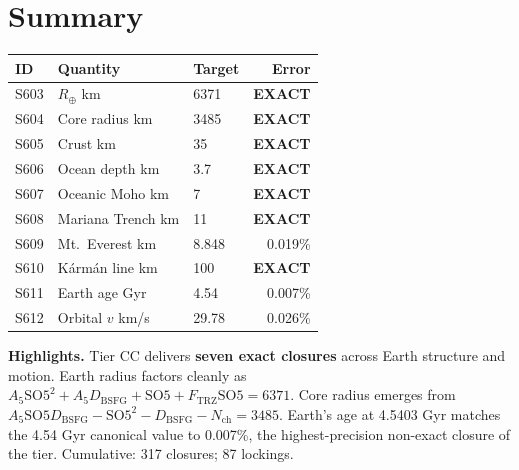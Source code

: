 \documentclass[11pt]{article}
\newcommand{\Ftrz}{F_{\mathrm{TRZ}}}
\newcommand{\Dbsfg}{D_{\mathrm{BSFG}}}
\newcommand{\Nch}{N_{\mathrm{ch}}}
\newcommand{\SOfive}{\mathrm{SO5}}
\newcommand{\Afive}{A_5}
\begin{document}
\section*{Summary}
\begin{tabular}{lllr}
\toprule
ID & Quantity & Target & Error \\
\midrule
S603 & $R_\oplus$ km & 6371 & \textbf{EXACT} \\
S604 & Core radius km & 3485 & \textbf{EXACT} \\
S605 & Crust km & 35 & \textbf{EXACT} \\
S606 & Ocean depth km & 3.7 & \textbf{EXACT} \\
S607 & Oceanic Moho km & 7 & \textbf{EXACT} \\
S608 & Mariana Trench km & 11 & \textbf{EXACT} \\
S609 & Mt.\ Everest km & 8.848 & 0.019\% \\
S610 & K\'arm\'an line km & 100 & \textbf{EXACT} \\
S611 & Earth age Gyr & 4.54 & 0.007\% \\
S612 & Orbital $v$ km/s & 29.78 & 0.026\% \\
\bottomrule
\end{tabular}

\medskip
\textbf{Highlights.} Tier CC delivers \textbf{seven exact closures} across Earth structure and motion. Earth radius factors cleanly as $\Afive\SOfive^2 + \Afive\Dbsfg + \SOfive + \Ftrz\SOfive = 6371$. Core radius emerges from $\Afive\SOfive\Dbsfg - \SOfive^2 - \Dbsfg - \Nch = 3485$. Earth's age at 4.5403 Gyr matches the 4.54 Gyr canonical value to 0.007\%, the highest-precision non-exact closure of the tier. Cumulative: 317 closures; 87 lockings.
\end{document}
